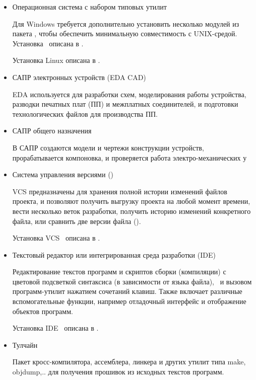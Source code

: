 
\begin{itemize}
  \item Операционная система с набором типовых утилит
  
  Для Windows требуется дополнительно установить несколько модулей из пакета
  , чтобы обеспечить минимальную совместимость с UNIX-средой.
  Установка \ описана в .
  
  Установка Linux описана в .
  
  \item САПР электронных устройств (EDA CAD)
  
  EDA используется для разработки схем, моделирования работы устройства,
  разводки печатных плат (ПП) и межплатных соединителей, и подготовки
  технологических файлов для производства ПП.
  
  \item САПР общего назначения
  
  В САПР создаются модели и чертежи конструкции устройств, прорабатывается
  компоновка, и проверяется работа электро-механических у    
  
  \item Система управления версиями ()
  
  VCS предназначены для хранения полной истории изменений файлов проекта, и
  позволяют получить выгрузку проекта на любой момент времени, вести несколько
  веток разработки, получить историю изменений конкретного файла, или сравнить
  две версии файла ().
  
  Установка VCS \git\ описана в .
  
  \item Текстовый редактор или интегрированная среда разработки (IDE)
  
  Редактирование текстов программ и скриптов сборки (компиляции) с
  цветовой подсветкой синтаксиса (в зависимости от языка файла),
  \ и вызовом программ-утилит нажатием сочетаний 
  клавиш. Также включает различные вспомогательные функции, например
  отладочный интерфейс и отображение объектов программ.
  
  Установка IDE \eclipse\ описана в .
  
  \item Тулчайн
  
  Пакет кросс-компилятора, ассемблера, линкера и других утилит типа make,
  objdump,.. для получения прошивок из исходных текстов программ.
  

\end{itemize}
